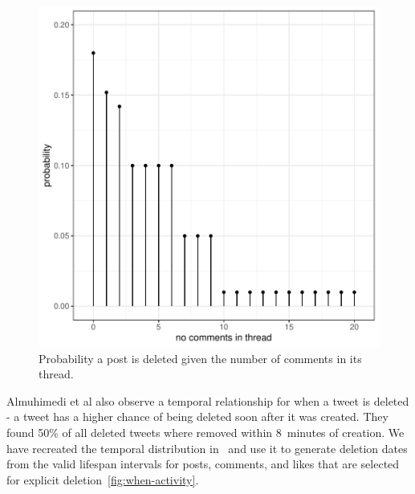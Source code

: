 \begin{figure}[H]
  \centering
  \includegraphics[scale=\yedscale]{figures/fig-if-post}
  \caption{Probability a post is deleted given the number of comments in its thread.}
  \label{fig:if-post}
\end{figure}

Almuhimedi et al also observe a temporal relationship for when a tweet is deleted - a tweet has a higher chance of being deleted soon
after it was created.
They found 50\% of all deleted tweets where removed within 8~minutes of creation.
We have recreated the temporal distribution in~\cite{DBLP:conf/cscw/AlmuhimediWLSA13} and use it to generate deletion dates from
the valid lifespan intervals for posts, comments, and likes that are selected for explicit deletion~\autoref{fig:when-activity}.

